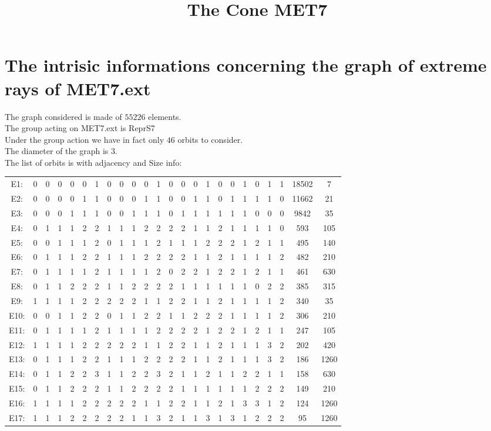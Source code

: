 \documentclass[12pt]{article}
\title{The Cone MET7}
\begin{document}
\maketitle
\section{The intrisic informations concerning the graph of extreme rays of MET7.ext}
The graph considered is made of $55226$ elements.\\
The group acting on MET7.ext is ReprS7\\
Under the group action we have in fact only $46$ orbits to consider.\\
The diameter of the graph is $3$.\\
The list of orbits is with adjacency and Size info:
\begin{center}
\scriptsize
\begin{tabular}{cccccccccccccccccccccc|c|c}
E1:&0&0&0&0&0&1&0&0&0&0&1&0&0&0&1&0&0&1&0&1&1&18502&7\\
E2:&0&0&0&0&1&1&0&0&0&1&1&0&0&1&1&0&1&1&1&1&0&11662&21\\
E3:&0&0&0&1&1&1&0&0&1&1&1&0&1&1&1&1&1&1&0&0&0&9842&35\\
E4:&0&1&1&1&2&2&1&1&1&2&2&2&2&1&1&2&1&1&1&1&0&593&105\\
E5:&0&0&1&1&1&2&0&1&1&1&2&1&1&1&2&2&2&1&2&1&1&495&140\\
E6:&0&1&1&1&2&2&1&1&1&2&2&2&2&1&1&2&1&1&1&1&2&482&210\\
E7:&0&1&1&1&1&2&1&1&1&1&2&0&2&2&1&2&2&1&2&1&1&461&630\\
E8:&0&1&1&2&2&2&1&1&2&2&2&2&1&1&1&1&1&1&0&2&2&385&315\\
E9:&1&1&1&1&2&2&2&2&2&1&1&2&2&1&1&2&1&1&1&1&2&340&35\\
E10:&0&0&1&1&2&2&0&1&1&2&2&1&1&2&2&2&1&1&1&1&2&306&210\\
E11:&0&1&1&1&1&2&1&1&1&1&2&2&2&2&1&2&2&1&2&1&1&247&105\\
E12:&1&1&1&1&2&2&2&2&2&1&1&2&2&1&1&2&1&1&1&3&2&202&420\\
E13:&0&1&1&1&2&2&1&1&1&2&2&2&2&1&1&2&1&1&1&3&2&186&1260\\
E14:&0&1&1&2&2&3&1&1&2&2&3&2&1&1&2&1&1&2&2&1&1&158&630\\
E15:&0&1&1&2&2&2&1&1&2&2&2&2&1&1&1&1&1&1&2&2&2&149&210\\
E16:&1&1&1&1&2&2&2&2&2&1&1&2&2&1&1&2&1&3&3&1&2&124&1260\\
E17:&1&1&1&2&2&2&2&2&1&1&3&2&1&1&3&1&3&1&2&2&2&95&1260\\

\end{tabular}
\end{center}
\end{document}
